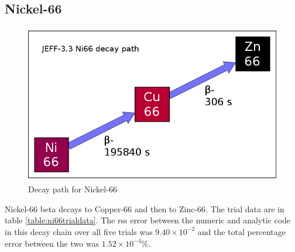 \clearpage
\subsection{Nickel-66}

\FloatBarrier
\begin{figure}[!h]
\centering
		\includegraphics[width=.4\linewidth]{appendix/activity_equation/decay_paths/28ni66_decay.png}
		\caption{Decay path for Nickel-66 \cite{jeff311}}
		\label{fig:decayni66}
\end{figure}
\FloatBarrier

Nickel-66 beta decays to Copper-66 and then to Zinc-66.  The trial data are in table \ref{table:ni66trialdata}.  The \acrshort{rss} error between the numeric and analytic code in this decay chain over all five trials was $9.40 \times 10^{-2}$ and the total percentage error between the two was $1.52 \times 10^{-4}\%$.

